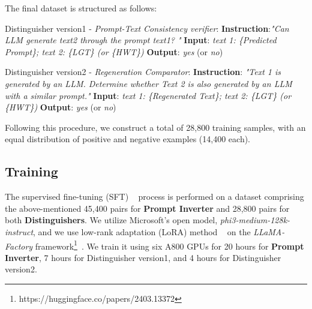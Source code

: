 The final dataset is structured as follows:  


Distinguisher version1 - \textit{Prompt-Text Consistency verifier}: \textbf{Instruction}:\textit{"Can LLM generate text2 through the prompt text1? "}  
\textbf{Input}: \textit{text 1: \{Predicted Prompt\}; text 2: \{LGT\} (or \{HWT\})}    
\textbf{Output}: \textit{yes} (or \textit{no})  

Distinguisher version2 - \textit{Regeneration Comparator}: \textbf{Instruction}: \textit{"Text 1 is generated by an LLM. Determine whether Text 2 is also generated by an LLM with a similar prompt."} 
\textbf{Input}: \textit{text 1: \{Regenerated Text\}; text 2: \{LGT\} (or \{HWT\})}  
\textbf{Output}: \textit{yes} (or \textit{no})  

Following this procedure, we construct a total of 28,800 training samples, with an equal distribution of positive and negative examples (14,400 each).

\subsection{Training}
The supervised fine-tuning (SFT) ~\cite{r70} process is performed on a dataset comprising the above-mentioned 45,400 pairs for \textbf{Prompt Inverter} and 28,800 pairs for both \textbf{Distinguishers}. We utilize Microsoft's open model, \textit{phi3-medium-128k-instruct}, and we use low-rank adaptation (LoRA) method ~\cite{r69} on the \textit{LLaMA-Factory} framework\footnote{https://huggingface.co/papers/2403.13372}~\cite{r68}. We train it using six A800 GPUs for 20 hours for \textbf{Prompt Inverter}, 7 hours for Distinguisher version1, and 4 hours for Distinguisher version2. 